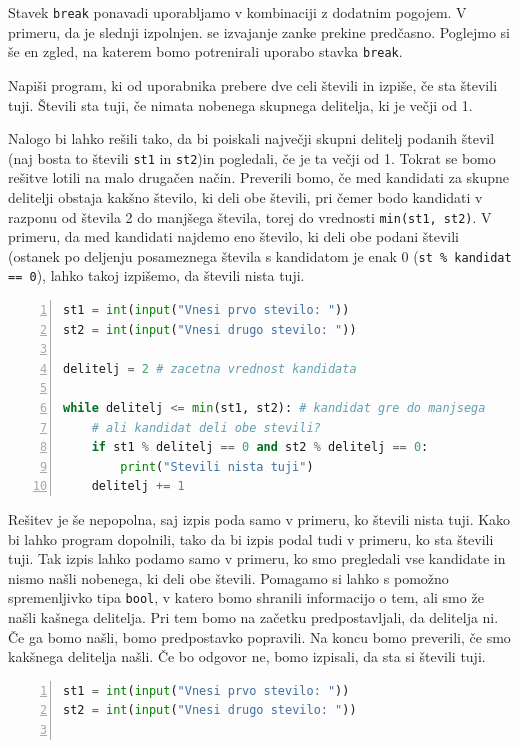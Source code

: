 Stavek \texttt{break} ponavadi uporabljamo v kombinaciji z dodatnim pogojem. V primeru, da je slednji izpolnjen. se izvajanje zanke prekine predčasno. Poglejmo si še en zgled, na katerem bomo potrenirali uporabo stavka \texttt{break}. 

\begin{zgled}
Napiši program, ki od uporabnika prebere dve celi števili in izpiše, če sta števili tuji. Števili sta tuji, če nimata nobenega skupnega delitelja, ki je večji od 1.
\end{zgled}
\begin{resitev}
Nalogo bi lahko rešili tako, da bi poiskali največji skupni delitelj podanih števil (naj bosta to števili \texttt{st1} in \texttt{st2})in pogledali, če je ta večji od 1. Tokrat se bomo rešitve lotili na malo drugačen način. Preverili bomo, če med kandidati za skupne delitelji obstaja kakšno število, ki deli obe števili, pri čemer bodo kandidati v razponu od števila 2 do manjšega števila, torej do vrednosti \texttt{min(st1, st2)}. V primeru, da med kandidati najdemo eno število, ki deli obe podani števili (ostanek po deljenju posameznega števila s kandidatom je enak 0 (\texttt{st \% kandidat == 0}), lahko takoj izpišemo, da števili nista tuji.
\begin{lstlisting}[language=Python,numbers=left]
st1 = int(input("Vnesi prvo stevilo: "))
st2 = int(input("Vnesi drugo stevilo: "))

delitelj = 2 # zacetna vrednost kandidata

while delitelj <= min(st1, st2): # kandidat gre do manjsega
    # ali kandidat deli obe stevili?
    if st1 % delitelj == 0 and st2 % delitelj == 0:
        print("Stevili nista tuji")
    delitelj += 1
\end{lstlisting}
Rešitev je še nepopolna, saj izpis poda samo v primeru, ko števili nista tuji. Kako bi lahko program dopolnili, tako da bi izpis podal tudi v primeru, ko sta števili tuji. Tak izpis lahko podamo samo v primeru, ko smo pregledali vse kandidate in nismo našli nobenega, ki deli obe števili. Pomagamo si lahko s pomožno spremenljivko tipa \texttt{bool}, v katero bomo shranili informacijo o tem, ali smo že našli kašnega delitelja. Pri tem bomo na začetku predpostavljali, da delitelja ni. Če ga bomo našli, bomo predpostavko popravili. Na koncu bomo preverili, če smo kakšnega delitelja našli. Če bo odgovor ne, bomo izpisali, da sta si števili tuji.
\begin{lstlisting}[language=Python,numbers=left]
st1 = int(input("Vnesi prvo stevilo: "))
st2 = int(input("Vnesi drugo stevilo: "))


\end{lstlisting}
\end{resitev}
